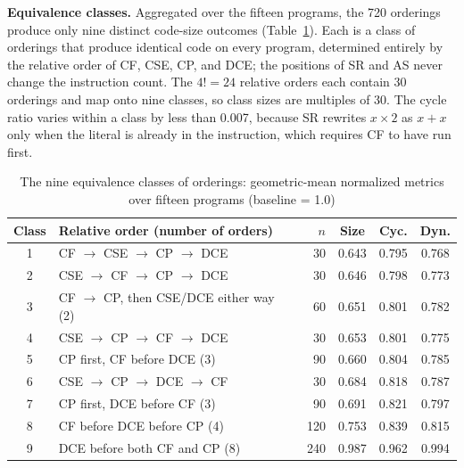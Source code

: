 \documentclass[conference]{IEEEtran}
\begin{document}
\textbf{Equivalence classes.} Aggregated over the fifteen programs, the 720 orderings produce only nine distinct code-size outcomes (Table~\ref{tab:classes}). Each is a class of orderings that produce identical code on every program, determined entirely by the relative order of CF, CSE, CP, and DCE; the positions of SR and AS never change the instruction count. The $4! = 24$ relative orders each contain 30 orderings and map onto nine classes, so class sizes are multiples of 30. The cycle ratio varies within a class by less than 0.007, because SR rewrites $x \times 2$ as $x + x$ only when the literal is already in the instruction, which requires CF to have run first.

\begin{table}[!htbp]
\centering
\caption{The nine equivalence classes of orderings: geometric-mean normalized metrics over fifteen programs (baseline = 1.0)}
\label{tab:classes}
\renewcommand{\arraystretch}{1.05}
{\footnotesize
\setlength{\tabcolsep}{2.5pt}
\begin{tabular}{@{}clrccc@{}}
\toprule
\textbf{Class} & \textbf{Relative order (number of orders)} & \textbf{$n$} & \textbf{Size} & \textbf{Cyc.} & \textbf{Dyn.} \\
\midrule
1 & CF $\to$ CSE $\to$ CP $\to$ DCE & 30 & 0.643 & 0.795 & 0.768 \\
2 & CSE $\to$ CF $\to$ CP $\to$ DCE & 30 & 0.646 & 0.798 & 0.773 \\
3 & CF $\to$ CP, then CSE/DCE either way (2) & 60 & 0.651 & 0.801 & 0.782 \\
4 & CSE $\to$ CP $\to$ CF $\to$ DCE & 30 & 0.653 & 0.801 & 0.775 \\
5 & CP first, CF before DCE (3) & 90 & 0.660 & 0.804 & 0.785 \\
6 & CSE $\to$ CP $\to$ DCE $\to$ CF & 30 & 0.684 & 0.818 & 0.787 \\
7 & CP first, DCE before CF (3) & 90 & 0.691 & 0.821 & 0.797 \\
8 & CF before DCE before CP (4) & 120 & 0.753 & 0.839 & 0.815 \\
9 & DCE before both CF and CP (8) & 240 & 0.987 & 0.962 & 0.994 \\
\bottomrule
\end{tabular}
}
\end{table}
\end{document}
